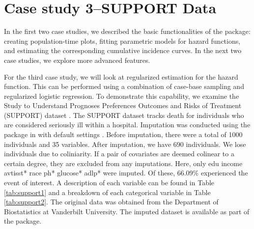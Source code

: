 \documentclass[
]{jss}
\begin{document}
\hypertarget{case-study-3support-data}{%
\section{Case study 3--SUPPORT Data}\label{case-study-3support-data}}

In the first two case studies, we described the basic functionalities of
the  package: creating population-time plots, fitting
parametric models for hazard functions, and estimating the corresponding
cumulative incidence curves. In the next two case studies, we explore
more advanced features.

For the third case study, we will look at regularized estimation for the
hazard function. This can be performed using a combination of case-base
sampling and regularized logistic regression. To demonstrate this
capability, we examine the Study to Understand Prognoses Preferences
Outcomes and Risks of Treatment (SUPPORT) dataset
\citep{knaus1995support}. The SUPPORT dataset tracks death for
individuals who are considered seriously ill within a hospital.
Imputation was conducted using the  package in 
with default settings \citep{mice}. Before imputation, there were a
total of 1000 individuals and 35 variables. After imputation, we have
690 individuals. We lose individuals due to coliniarity. If a pair of
covariates are deemed colinear to a certain degree, they are excluded
from any imputations. Here, only edu income avtisst* race ph* glucose*
adlp* were imputed. Of these, 66.09\% experienced the event of interest.
A description of each variable can be found in Table \ref{tab:support1}
and a breakdown of each categorical variable in Table
\ref{tab:support2}. The original data was obtained from the Department
of Biostatistics at Vanderbilt University. The imputed dataset is
available as part of the  package.
\end{document}
